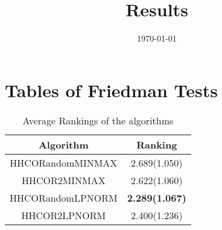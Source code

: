 \documentclass{article}
\title{Results}
\author{}
\date{\today}
\begin{document}
\oddsidemargin 0in \topmargin 0in\maketitle
\section{Tables of Friedman Tests}
\begin{table}[!htp]
\centering
\caption{Average Rankings of the algorithms
}\begin{tabular}{|c|c|}
\hline
Algorithm&Ranking\\
\hline
HHCORandomMINMAX&2.689(1.050)\\\hline
HHCOR2MINMAX&2.622(1.060)\\\hline
HHCORandomLPNORM& {\bf 2.289(1.067)}\\\hline
HHCOR2LPNORM&2.400(1.236)\\\hline
\end{tabular}
\end{table}
\end{document}
